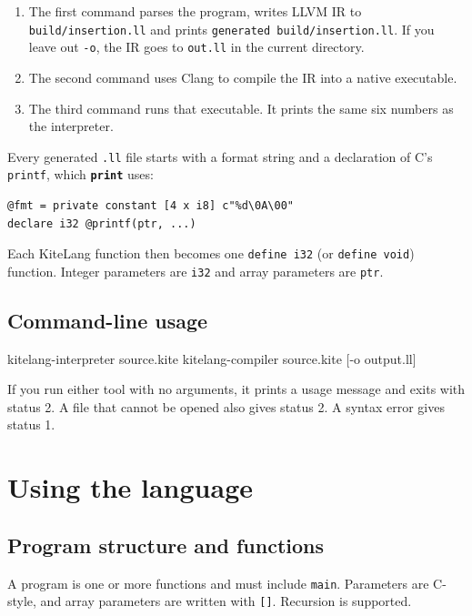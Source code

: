 \documentclass[11pt,a4paper]{article}
\newcommand{\kw}[1]{\texttt{\textcolor{cInput}{\textbf{#1}}}}
\newcommand{\fn}[1]{\texttt{#1}}
\begin{document}
\begin{enumerate}
\item The first command parses the program, writes LLVM IR to \fn{build/insertion.ll} and prints \fn{generated build/insertion.ll}. If you leave out \fn{-o}, the IR goes to \fn{out.ll} in the current directory.
\item The second command uses Clang to compile the IR into a native executable.
\item The third command runs that executable. It prints the same six numbers as the interpreter.
\end{enumerate}

Every generated \fn{.ll} file starts with a format string and a declaration of C's \fn{printf}, which \kw{print} uses:

\begin{lstlisting}
@fmt = private constant [4 x i8] c"%d\0A\00"
declare i32 @printf(ptr, ...)
\end{lstlisting}

Each KiteLang function then becomes one \fn{define i32} (or \fn{define void}) function. Integer parameters are \fn{i32} and array parameters are \fn{ptr}.

\subsection{Command-line usage}

\begin{shell}
kitelang-interpreter source.kite
kitelang-compiler   source.kite [-o output.ll]
\end{shell}

If you run either tool with no arguments, it prints a usage message and exits with status 2. A file that cannot be opened also gives status 2. A syntax error gives status 1.

\section{Using the language}

\subsection{Program structure and functions}

A program is one or more functions and must include \fn{main}. Parameters are C-style, and array parameters are written with \fn{[]}. Recursion is supported.
\end{document}
